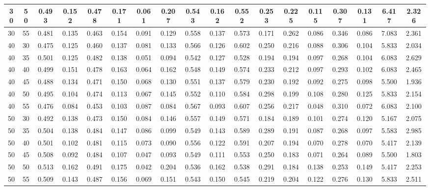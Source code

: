 \begin{longtable}[c]{|c|c|c|c|c|c|c|c|c|c|c|c|c|c|c|c|c|c|}
  30 & 50 & 0.493 & 0.152 & 0.478 & 0.171 & 0.061 & 0.207 & 0.543 & 0.162 & 0.552 & 0.253 & 0.225 & 0.115 & 0.307 & 0.131 & 6.417 & 2.326  \\ \hline 
  30 & 55 & 0.481 & 0.135 & 0.463 & 0.154 & 0.091 & 0.129 & 0.558 & 0.137 & 0.573 & 0.171 & 0.262 & 0.086 & 0.346 & 0.086 & 7.083 & 2.361  \\ \hline 
  40 & 30 & 0.475 & 0.125 & 0.460 & 0.137 & 0.081 & 0.133 & 0.566 & 0.126 & 0.602 & 0.250 & 0.216 & 0.088 & 0.306 & 0.104 & 5.833 & 2.034  \\ \hline 
  40 & 35 & 0.501 & 0.125 & 0.482 & 0.138 & 0.051 & 0.094 & 0.542 & 0.127 & 0.528 & 0.194 & 0.194 & 0.097 & 0.268 & 0.104 & 6.083 & 2.629  \\ \hline 
  40 & 40 & 0.499 & 0.151 & 0.478 & 0.163 & 0.064 & 0.162 & 0.548 & 0.149 & 0.574 & 0.233 & 0.212 & 0.097 & 0.293 & 0.102 & 6.083 & 2.465  \\ \hline 
  40 & 45 & 0.488 & 0.134 & 0.471 & 0.150 & 0.068 & 0.130 & 0.551 & 0.137 & 0.579 & 0.230 & 0.192 & 0.092 & 0.275 & 0.098 & 5.500 & 1.936  \\ \hline 
  40 & 50 & 0.495 & 0.104 & 0.474 & 0.113 & 0.067 & 0.145 & 0.552 & 0.110 & 0.584 & 0.298 & 0.199 & 0.108 & 0.280 & 0.125 & 5.833 & 2.154  \\ \hline 
  40 & 55 & 0.476 & 0.084 & 0.453 & 0.103 & 0.087 & 0.084 & 0.567 & 0.093 & 0.607 & 0.256 & 0.217 & 0.048 & 0.310 & 0.072 & 6.083 & 2.100  \\ \hline 
  50 & 30 & 0.492 & 0.138 & 0.473 & 0.150 & 0.084 & 0.146 & 0.557 & 0.149 & 0.571 & 0.184 & 0.189 & 0.101 & 0.274 & 0.120 & 5.167 & 2.075  \\ \hline 
  50 & 35 & 0.504 & 0.138 & 0.484 & 0.147 & 0.086 & 0.099 & 0.549 & 0.143 & 0.589 & 0.289 & 0.191 & 0.087 & 0.268 & 0.097 & 5.583 & 2.985  \\ \hline 
  50 & 40 & 0.501 & 0.102 & 0.481 & 0.115 & 0.073 & 0.090 & 0.556 & 0.122 & 0.591 & 0.207 & 0.194 & 0.070 & 0.278 & 0.070 & 5.417 & 2.139  \\ \hline 
  50 & 45 & 0.508 & 0.092 & 0.484 & 0.107 & 0.047 & 0.093 & 0.549 & 0.111 & 0.553 & 0.250 & 0.183 & 0.071 & 0.264 & 0.089 & 5.500 & 1.803  \\ \hline 
  50 & 50 & 0.513 & 0.162 & 0.491 & 0.175 & 0.042 & 0.204 & 0.536 & 0.162 & 0.538 & 0.291 & 0.184 & 0.138 & 0.253 & 0.149 & 5.417 & 2.253  \\ \hline 
  50 & 55 & 0.509 & 0.143 & 0.487 & 0.156 & 0.069 & 0.151 & 0.543 & 0.150 & 0.545 & 0.219 & 0.204 & 0.122 & 0.276 & 0.130 & 5.833 & 2.511  \\ \hline 

\end{longtable}
